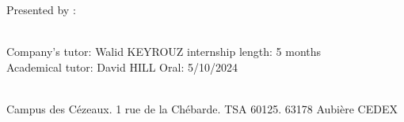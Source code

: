 \begin{titlepage}
\begin{center}
    \vspace{1.5cm}
    \begin{large}
      Presented by : \textbf{\authorName}\\
    \end{large}
  \end{center}

  \vspace{4cm}~\\
  Company's tutor: Walid KEYROUZ \hfill internship length: 5 months\\
  Academical tutor: David HILL \hfill Oral: 5/10/2024\\~\\

  \begin{center}
    \begin{small}
      Campus des Cézeaux. 1 rue de la Chébarde. TSA 60125. 63178 Aubière CEDEX\par
    \end{small}
  \end{center}
\end{titlepage}
